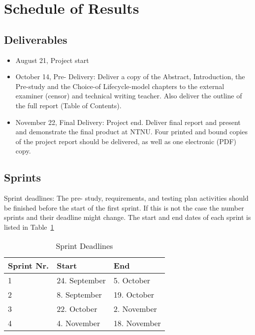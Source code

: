 \section{Schedule of Results}
\subsection {Deliverables}

\begin {itemize}

\item August 21, Project start

\item October 14, Pre- Delivery: Deliver a copy of the Abstract, Introduction, the Pre-study and the Choice-of Lifecycle-model chapters to the external examiner (censor) and technical writing teacher. Also deliver the outline of the full report (Table of  Contents).

\item November 22, Final Delivery: Project end. Deliver final report and present and demonstrate the final product at NTNU. Four printed and bound copies of  the project report should be delivered, as well as one electronic (PDF) copy.

\end {itemize}

\subsection {Sprints}

Sprint deadlines:
The pre- study, requirements, and testing plan activities should be finished before the start of the first sprint. If this is not the case the number sprints and their deadline might change. The start and end dates of each sprint is listed in Table~\ref{table:sprintdeadlines}

\begin{table}
\caption{Sprint Deadlines}
\centering
\begin{tabular}{ l l l }
\hline
Sprint Nr.		&Start		&End		\\
\hline
1		&24. September		&5. October		\\
2		&8. September			&19. October		\\
3		&22. October			&2. November		\\
4		&4. November			&18. November	\\
\hline
\end{tabular}
\label{table:sprintdeadlines}
\end{table}

